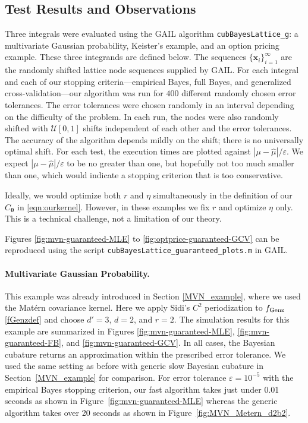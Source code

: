 \documentclass{svjour3}                     %
\newcommand{\bm}[1]{\boldsymbol{#1}}
\newcommand{\vtheta}{{\bm{\theta}}}
\newcommand{\vx}{\bm{x}}
\newcommand{\hmu}{\widehat{\mu}}
\newcommand{\code}[1]{\texttt{#1}}
\def\abs#1{\ensuremath{\left \lvert #1 \right \rvert}}
\newcommand\figref{Figure~\ref}
\newcommand\secref{Section~\ref}
\begin{document}
\subsection{Test Results and Observations}

Three integrals were evaluated using the GAIL algorithm \code{cubBayesLattice\_g}:  a multivariate Gaussian  probability, Keister's example, and an option pricing example. 
These three integrands are defined below.
The sequences $\{\vx_i\}_{i=1}^\infty$ are the randomly shifted lattice node sequences supplied by GAIL. 
For each integral and each of our stopping criteria---empirical Bayes, full Bayes, and generalized cross-validation---our algorithm was run for $400$ different randomly chosen error tolerances. The error tolerances were chosen randomly in an interval depending on the difficulty of the problem. In each run, the nodes were also randomly shifted with $\mathcal{U}[0,1]$ shifts independent of each other and the error tolerances. The accuracy of the algorithm depends mildly on the shift; there is no universally optimal shift.
For each test, the execution times are plotted against $\abs{\mu - \hmu}/\varepsilon$.  We expect $\abs{\mu - \hmu}/\varepsilon$ to be no greater than one, but hopefully not too much smaller than one, which would indicate a stopping criterion that is too conservative. 

Ideally, we would optimize both $r$ and $\eta$ simultaneously in the definition of our $C_\vtheta$ in \eqref{eqn:ourkernel}.  However, in these examples we fix $r$ and optimize $\eta$ only.  This is a technical challenge, not a limitation of our theory.

Figures \ref{fig:mvn-guaranteed-MLE} to \ref{fig:optprice-guaranteed-GCV} can be reproduced using the script \break \code{cubBayesLattice\_guaranteed\_plots.m} in GAIL.


\paragraph{Multivariate Gaussian Probability.}

This example was already introduced in Section \ref{MVN_example}, where we used the Mat\'ern covariance kernel.  Here we apply Sidi's $C^2$  periodization to $ f_{\textup{Genz}}$ \eqref{fGenzdef} and choose $d'=3$, $d=2$, and $r=2$. The simulation results for this example are summarized in Figures \ref{fig:mvn-guaranteed-MLE}, \ref{fig:mvn-guaranteed-FB}, and \ref{fig:mvn-guaranteed-GCV}.  In all cases, the Bayesian cubature returns an approximation within the prescribed error tolerance. We used the same setting as before with generic slow Bayesian cubature in \secref{MVN_example} for comparison. For error tolerance $\varepsilon=10^{-5}$ with the empirical Bayes stopping criterion, our fast algorithm takes just under 0.01 seconds as shown in \figref{fig:mvn-guaranteed-MLE} whereas the generic algorithm takes over 20 seconds as shown in \figref{fig:MVN_Metern_d2b2}. 
\end{document}
